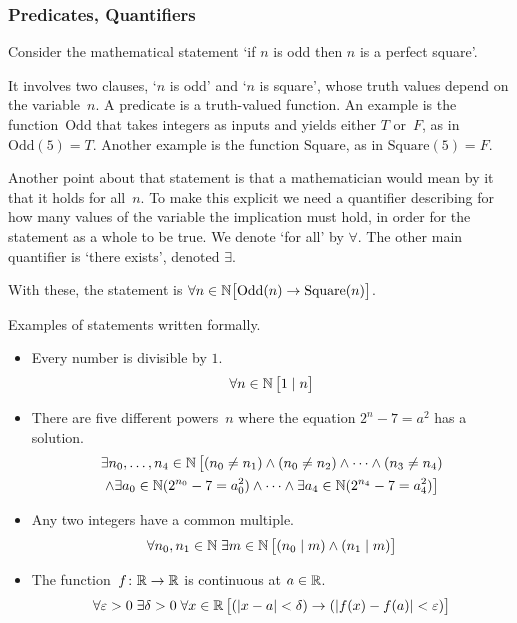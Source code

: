 \documentclass[10pt,t]{beamer}
\begin{document}
\begin{frame}
\frametitle{Predicates, Quantifiers}
Consider the mathematical
statement `if $n$ is odd then $n$ is a perfect square'.

\pause
It involves two clauses, `$n$ is odd' and `$n$ is square',
whose truth values depend on the variable~$n$.
A \alert{predicate} is a truth-valued function.
An example is the function~$\text{Odd}$ that takes integers as inputs and 
yields either $T$ or~$F$, as in~$\text{Odd}(5)=T$.
Another example is the function $\text{Square}$, as in $\text{Square}(5)=F$.

\pause
Another point about that statement is that a mathematician would mean by it 
that it holds for all~$n$.
To make this explicit we need a
\alert{quantifier} describing for how many values of the
variable the implication must hold, in order for the statement as a whole to
be true.
We denote `for all' by $\forall$.
The other main quantifier is 
`there exists', denoted $\exists$.

With these, the statement is 
$\forall n\in\mathbb{N} \big[\text{Odd}(n)\rightarrow\text{Square}(n)\big]$.
\end{frame}
\begin{frame}
Examples of statements written formally.

\begin{itemize}
\item Every number is divisible by $1$.
  \begin{equation*}
    \forall n\in\mathbb{N}\,\big[1\mid n\big]
  \end{equation*}

\pause
\item There are five different powers~$n$ where the equation $2^n-7=a^2$ has a solution.
  \begin{multline*}
    \exists n_0, \ldots, n_4\in\mathbb{N}\, \big[(n_0\neq n_1) 
                                     \wedge (n_0\neq n_2) 
                                     \wedge \cdots 
                                     \wedge (n_3\neq n_4)  \\
                                     \wedge \exists a_0\in\mathbb{N}(2^{n_0}-7=a_0^2)
                                     \wedge\cdots\wedge
                                     \exists a_4\in\mathbb{N}(2^{n_4}-7=a_4^2)\big]
  \end{multline*}

\pause
\item Any two integers have a common multiple.
  \begin{equation*}
    \forall n_0,n_1\in\mathbb{N}\;\exists m\in\mathbb{N}\,
        \big[(n_0\mid m)\wedge (n_1\mid m)\big]
  \end{equation*}

\pause
\item The function~$\mbox{$f\colon \mathbb{R}\to \mathbb{R}$}$ is continuous at $a\in\mathbb{R}$.
  \begin{equation*}
    \forall \varepsilon >0\;\exists \delta > 0\;\forall x\in\mathbb{R}\,
        \big[(\lvert x-a\rvert<\delta)\rightarrow (\lvert f(x)-f(a)\rvert<\varepsilon)\big]
  \end{equation*}
\end{itemize}
\end{frame}
\end{document}

